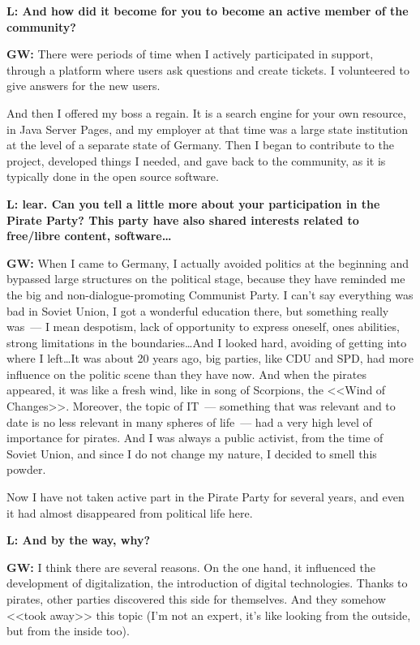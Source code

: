 \documentclass[10pt, a5paper]{article}
\begin{document}
\begin{Parallel}[p]{}{}
{{\noindent \bf L: And how did it become for you to become an active member of the community? }

{\noindent \bf GW:} There were periods of time when I actively participated in support, through a platform where users ask questions and create tickets. I volunteered to give answers for the new users.

And then I offered my boss a regain. It is a search engine for your own resource, in Java Server Pages, and my employer at that time was a large state institution at the level of a separate state of Germany. Then I began to contribute to the project, developed things I needed, and gave back to the community, as it is typically done in the open source software.

{\noindent \bf L: lear. Can you tell a little more about your participation in the Pirate Party? This party have also shared interests related to free/libre content, software\ldots}

{\noindent \bf GW:} When I came to Germany, I actually avoided politics at the beginning and bypassed large structures on the political stage, because they have reminded me the big and non-dialogue-promoting Communist Party. I can't say everything was bad in Soviet Union, I got a wonderful education there, but something really was~--- I mean despotism, lack of opportunity to express oneself, ones abilities, strong limitations in the boundaries\ldots And I looked hard, avoiding of getting into where I left\ldots It was about 20 years ago, big parties, like CDU and SPD, had more influence on the politic scene than they have now. And when the pirates appeared, it was like a fresh wind, like in song of Scorpions, the <<Wind of Changes>>. Moreover, the topic of IT~--- something that was relevant and to date is no less relevant in many spheres of life~--- had a very high level of importance for pirates. And I was always a public activist, from the time of Soviet Union, and since I do not change my nature, I decided to smell this powder.

Now I have not taken active part in the Pirate Party for several years, and even it had almost disappeared from political life here.
 
{\noindent \bf L: And by the way, why?}

{\noindent \bf GW:} I think there are several reasons. On the one hand, it influenced the development of digitalization, the introduction of digital technologies. Thanks to pirates, other parties discovered this side for themselves. And they somehow <<took away>> this topic (I'm not an expert, it's like looking from the outside, but from the inside too).

}
\end{Parallel}
\end{document}
